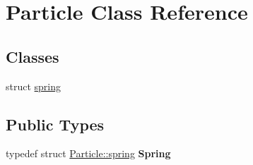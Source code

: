 \hypertarget{classParticle}{\section{Particle Class Reference}
\label{classParticle}
}
\subsection*{Classes}
\begin{DoxyCompactItemize}
\item 
struct \hyperlink{structParticle_1_1spring}{spring}
\end{DoxyCompactItemize}
\subsection*{Public Types}
\begin{DoxyCompactItemize}
\item 
\hypertarget{classParticle_a342eb4023785fdd39529f8ca5b994bff}{typedef struct \hyperlink{structParticle_1_1spring}{Particle\-::spring} {\bfseries Spring}}\label{classParticle_a342eb4023785fdd39529f8ca5b994bff}

\end{DoxyCompactItemize}
